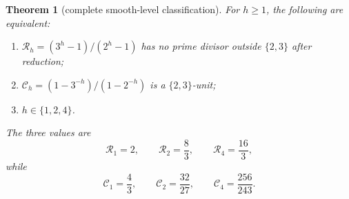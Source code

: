 \documentclass[11pt]{article}
\numberwithin{equation}{section}
\newtheorem{theorem}{Theorem}[section]
\theoremstyle{definition}
\theoremstyle{remark}
\begin{document}
\begin{theorem}[complete smooth-level classification]\label{thm:smoothclass}
For $h\ge1$, the following are equivalent:
\begin{enumerate}[label=(\roman*)]
  \item $\mathcal R_h=(3^h-1)/(2^h-1)$ has no prime divisor outside $\{2,3\}$ after reduction;
  \item $\mathcal C_h=(1-3^{-h})/(1-2^{-h})$ is a $\{2,3\}$-unit;
  \item $h\in\{1,2,4\}$.
\end{enumerate}
The three values are
\begin{equation}\label{eq:exceptionalR}
  \mathcal R_1=2,
  \qquad \mathcal R_2=\frac83,
  \qquad \mathcal R_4=\frac{16}{3},
\end{equation}
while
\begin{equation}\label{eq:exceptionalC}
  \mathcal C_1=\frac43,
  \qquad \mathcal C_2=\frac{32}{27},
  \qquad \mathcal C_4=\frac{256}{243}.
\end{equation}
\end{theorem}
\end{document}
